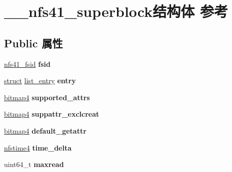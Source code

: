 \hypertarget{struct____nfs41__superblock}{}\section{\+\_\+\+\_\+nfs41\+\_\+superblock结构体 参考}
\label{struct____nfs41__superblock}
\subsection*{Public 属性}
\begin{DoxyCompactItemize}
\item 
\mbox{\label{struct____nfs41__superblock_afcda69455ad1938c741577c1034d81ee}} 
\hyperlink{struct____nfs41__fsid}{nfs41\+\_\+fsid} {\bfseries fsid}
\item 
\mbox{\label{struct____nfs41__superblock_a65534d0196ca507512f4d2bc37be8948}} 
\hyperlink{interfacestruct}{struct} \hyperlink{structlist__entry}{list\+\_\+entry} {\bfseries entry}
\item 
\mbox{\label{struct____nfs41__superblock_a8186d8fdeb975eaa600f3d8bb514d0bc}} 
\hyperlink{struct____bitmap4}{bitmap4} {\bfseries supported\+\_\+attrs}
\item 
\mbox{\label{struct____nfs41__superblock_a4d8aeeade846d7354a5840ece5fc568d}} 
\hyperlink{struct____bitmap4}{bitmap4} {\bfseries suppattr\+\_\+exclcreat}
\item 
\mbox{\label{struct____nfs41__superblock_a7d9945cd7adfe32506551cbc21a65ae7}} 
\hyperlink{struct____bitmap4}{bitmap4} {\bfseries default\+\_\+getattr}
\item 
\mbox{\label{struct____nfs41__superblock_a1805bece6900e4b470a44bad926aa09e}} 
\hyperlink{struct____nfstime4}{nfstime4} {\bfseries time\+\_\+delta}
\item 
\mbox{\label{struct____nfs41__superblock_a61aeeaaa9882804b6e64ea9006dc8f6c}} 
uint64\+\_\+t {\bfseries maxread}
\item 
\mbox{\label{struct____nfs41__superblock_a9400a23ee99cf2eb8fd0fa73f1213b1c}} 

\end{DoxyCompactItemize}
